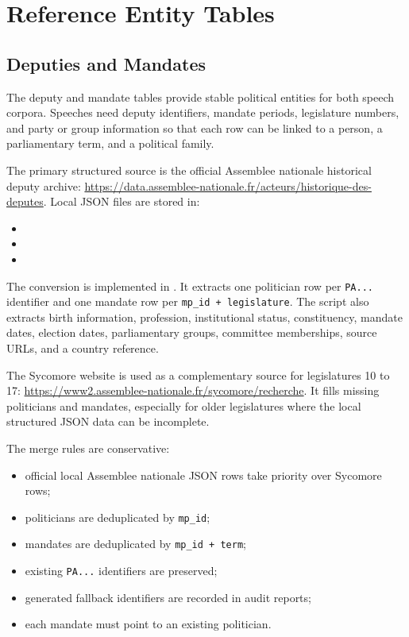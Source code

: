 \documentclass[11pt,a4paper]{article}
\begin{document}
\section{Reference Entity Tables}

\subsection{Deputies and Mandates}

The deputy and mandate tables provide stable political entities for both speech
corpora. Speeches need deputy identifiers, mandate periods, legislature numbers,
and party or group information so that each row can be linked to a person, a
parliamentary term, and a political family.

The primary structured source is the official Assemblee nationale historical
deputy archive:
\url{https://data.assemblee-nationale.fr/acteurs/historique-des-deputes}.
Local JSON files are stored in:

\begin{itemize}
  \item {}
  \item {}
  \item {}
\end{itemize}

The conversion is implemented in . It extracts
one politician row per \texttt{PA...} identifier and one mandate row per
\texttt{mp\_id + legislature}. The script also extracts birth information,
profession, institutional status, constituency, mandate dates, election dates,
parliamentary groups, committee memberships, source URLs, and a country
reference.

The Sycomore website is used as a complementary source for legislatures 10 to
17: \url{https://www2.assemblee-nationale.fr/sycomore/recherche}. It fills
missing politicians and mandates, especially for older legislatures where the
local structured JSON data can be incomplete.

The merge rules are conservative:

\begin{itemize}
  \item official local Assemblee nationale JSON rows take priority over
  Sycomore rows;
  \item politicians are deduplicated by \texttt{mp\_id};
  \item mandates are deduplicated by \texttt{mp\_id + term};
  \item existing \texttt{PA...} identifiers are preserved;
  \item generated fallback identifiers are recorded in audit reports;
  \item each mandate must point to an existing politician.
\end{itemize}
\end{document}
